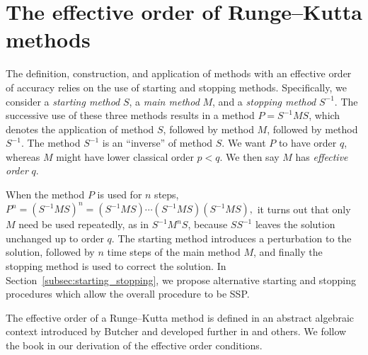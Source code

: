 \section{The effective order of Runge--Kutta methods}\label{sec:Algebraic_RK}

The definition, construction, and application of methods with an
effective order of accuracy relies on the use of starting and stopping
methods.
Specifically, we consider a \emph{starting method} $S$, a \emph{main
  method} $M$, and a \emph{stopping method} $S^{-1}$.
The successive use of these three methods results in a method $P =
S^{-1}MS$, which denotes the application of method $S$, followed by
method $M$, followed by method $S^{-1}$.
The method $S^{-1}$ is an ``inverse'' of method $S$.
We want $P$ to have order $q$, whereas $M$ might have lower classical
order $p < q$.
We then say $M$ has \emph{effective order} $q$.

When the method $P$ is used for $n$ steps,
$P^n = (S^{-1}MS)^n = (S^{-1}MS) \cdots (S^{-1}MS) (S^{-1}MS),$
it turns out that only $M$ need be used repeatedly, as in
$S^{-1} M^n S$,
because %
$S S^{-1}$ leaves the solution unchanged up to order $q$.
The starting method introduces a perturbation to the solution,
followed by $n$ time steps of the main method $M$, and finally the
stopping method is used to correct the solution.
In Section~\ref{subsec:starting_stopping}, we propose alternative
starting and stopping procedures which allow the overall procedure to
be SSP.

The effective order of a Runge--Kutta method is defined in an abstract 
algebraic context introduced by Butcher \cite{Butcher1969} and developed 
further in \cite{Butcher1972, Hairer1974, Butcher1996, Butcher1998} and 
others.
We follow the book \cite{Butcher2008_book} in our %
derivation of the effective order conditions.

